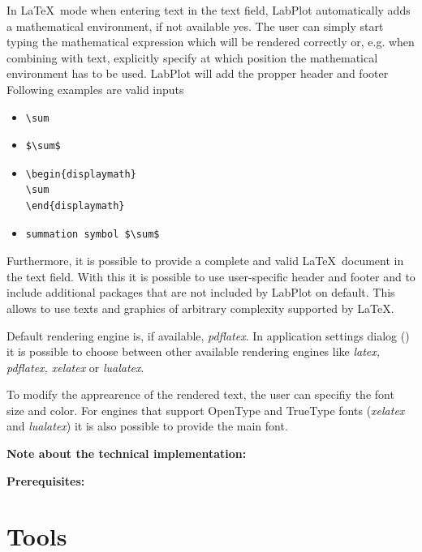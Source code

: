 In \LaTeX\, mode when entering text in the text field, LabPlot automatically adds a mathematical environment, if not available yes. The user can simply start typing the mathematical expression which will be rendered correctly or, e.g. when combining with text, explicitly specify at which position the mathematical environment has to be used. LabPlot will add the propper header and footer Following examples are valid inputs
\begin{itemize}
\item {
\begin{lstlisting}
\sum
\end{lstlisting}
}
%
\item {
\begin{lstlisting}
$\sum$
\end{lstlisting}
}
%
\item {
\begin{lstlisting}
\begin{displaymath}
\sum
\end{displaymath}
\end{lstlisting}
}
%
\item {
\begin{lstlisting}
summation symbol $\sum$
\end{lstlisting}
}
\end{itemize}

Furthermore, it is possible to provide a complete and valid \LaTeX\, document in the text field. With this it is possible to use user-specific header and footer and to include additional packages that are not included by LabPlot on default. This allows to use texts and graphics of arbitrary complexity supported by \LaTeX.

Default rendering engine is, if available, \textit{pdflatex}. In application settings dialog () it is possible to choose between other available rendering engines like \textit{latex, pdflatex, xelatex} or \textit{lualatex}.

To modify the apprearence of the rendered text, the user can specifiy the font size and color. For engines that support OpenType and TrueType fonts (\textit{xelatex} and \textit{lualatex}) it is also possible to provide the main font.

\textbf{Note about the technical implementation:}

\textbf{Prerequisites:}

\chapter{Tools}\label{ch:tools}
